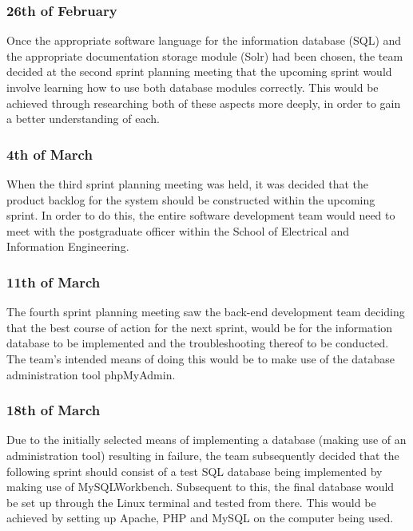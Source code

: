 \documentclass[journal]{IEEEtran}
\begin{document}
\subsubsection{26th of February}

Once the appropriate software language for the information database (SQL) and the appropriate documentation storage module (Solr) had been chosen, the team decided at the second sprint planning meeting that the upcoming sprint would involve learning how to use both database modules correctly. This would be achieved through researching both of these aspects more deeply, in order to gain a better understanding of each.
\\

\subsubsection{4th of March}

When the third sprint planning meeting was held, it was decided that the product backlog for the system should be constructed within the upcoming sprint. In order to do this, the entire software development team would need to meet with the postgraduate officer within the School of Electrical and Information Engineering.
\\

\subsubsection{11th of March}

The fourth sprint planning meeting saw the back-end development team deciding that the best course of action for the next sprint, would be for the information database to be implemented and the troubleshooting thereof to be conducted. The team's intended means of doing this would be to make use of the database administration tool phpMyAdmin.
\\

\subsubsection{18th of March}

Due to the initially selected means of implementing a database (making use of an administration tool) resulting in failure, the team subsequently decided that the following sprint should consist of a test SQL database being implemented by making use of MySQLWorkbench. Subsequent to this, the final database would be set up through the Linux terminal and tested from there. This would be achieved by setting up Apache, PHP and MySQL on the computer being used.
\\
\end{document}
